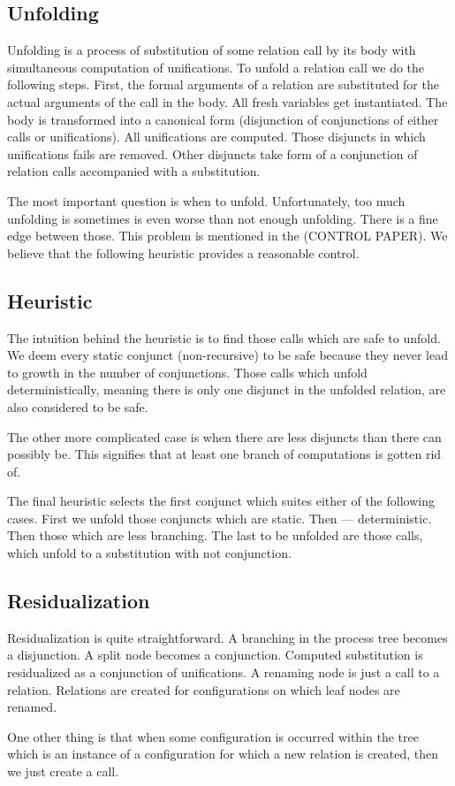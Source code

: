 \subsection{Unfolding}

Unfolding is a process of substitution of some relation call by its body with simultaneous computation of unifications.
To unfold a relation call we do the following steps.
First, the formal arguments of a relation are substituted for the actual arguments of the call in the body.
All fresh variables get instantiated.
The body is transformed into a canonical form (disjunction of conjunctions of either calls or unifications).
All unifications are computed.
Those disjuncts in which unifications fails are removed.
Other disjuncts take form of a conjunction of relation calls accompanied with a substitution.

The most important question is when to unfold.
Unfortunately, too much unfolding is sometimes is even worse than not enough unfolding.
There is a fine edge between those.
This problem is mentioned in the (CONTROL PAPER).
We believe that the following heuristic provides a reasonable control.

\subsection{Heuristic}

The intuition behind the heuristic is to find those calls which are safe to unfold.
We deem every static conjunct (non-recursive) to be safe because they never lead to growth in the number of conjunctions.
Those calls which unfold deterministically, meaning there is only one disjunct in the unfolded relation, are also considered to be safe.

The other more complicated case is when there are less disjuncts than there can possibly be.
This signifies that at least one branch of computations is gotten rid of.

The final heuristic selects the first conjunct which suites either of the following cases.
First we unfold those conjuncts which are static.
Then --- deterministic.
Then those which are less branching.
The last to be unfolded are those calls, which unfold to a substitution with not conjunction.

\subsection{Residualization}

Residualization is quite straightforward.
A branching in the process tree becomes a disjunction.
A split node becomes a conjunction.
Computed substitution is residualized as a conjunction of unifications.
A renaming node is just a call to a relation.
Relations are created for configurations on which leaf nodes are renamed.

One other thing is that when some configuration is occurred within the tree which is an instance of a configuration for which a new relation is created, then we just create a call.

